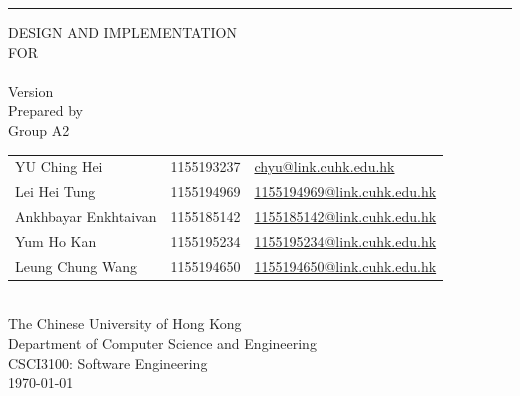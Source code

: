 \documentclass[a4paper, 11pt]{scrreprt}
\begin{document}

\begin{titlepage}
    \begin{flushright}
        \rule{\textwidth}{5pt}\vskip1cm
        \begin{bfseries}
            \Huge{DESIGN AND IMPLEMENTATION\\ FOR}\\
            \vspace{1.6cm}
            \projectname\\  %
            \vspace{1.6cm}
            \LARGE{Version \myversion}\\
            \vspace{1.6cm}
            Prepared by\\
            Group A2\\
            \Large{
                \begin{tabularx}{\textwidth}{l l >{\raggedleft\arraybackslash}X}
                    YU Ching Hei & 1155193237 & \href{mailto:chyu@link.cuhk.edu.hk}{chyu@link.cuhk.edu.hk}\\
                    Lei Hei Tung & 1155194969 & \href{mailto:1155194969@link.cuhk.edu.hk}{1155194969@link.cuhk.edu.hk}\\
                    Ankhbayar Enkhtaivan & 1155185142 & \href{mailto:1155185142@link.cuhk.edu.hk}{1155185142@link.cuhk.edu.hk}\\
                    Yum Ho Kan & 1155195234 & \href{mailto:1155195234@link.cuhk.edu.hk}{1155195234@link.cuhk.edu.hk}\\
                    Leung Chung Wang & 1155194650 & \href{mailto:1155194650@link.cuhk.edu.hk}{1155194650@link.cuhk.edu.hk}\\
                \end{tabularx}
            }\\
            \vspace{1.6cm}
            The Chinese University of Hong Kong\\
            Department of Computer Science and Engineering\\
            CSCI3100: Software Engineering\\
            \vspace{1.6cm}
            \today\\
        \end{bfseries}
    \end{flushright}
\end{titlepage}
\end{document}
